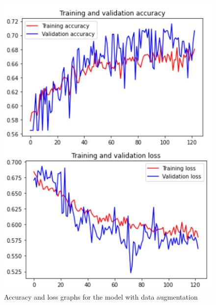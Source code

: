 \documentclass[11pt,a4paper,oneside]{article}
\begin{document}
\begin{figure}[h]
\centering
	\begin{minipage}[c]{.4\textwidth}
		\centering\setlength{\captionmargin}{0pt}%
		\includegraphics[width=.9\textwidth]{images/2.2/5_acc}
		\caption{Accuracy and loss graphs for the model with data augmentation}
		\label{fig:accuracy_2.2_1}
	\end{minipage}
	\hspace{5mm}%
	\begin{minipage}[c]{.4\textwidth}
		\centering\setlength{\captionmargin}{0pt}%

\end{minipage}
\end{figure}
\end{document}
